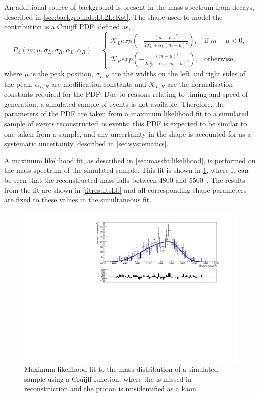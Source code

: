 An additional source of background is present in the \kk mass spectrum from  decays, described in \sect\ref{sec:backgrounds:Lb2LcKst}. The shape used to model the \decay{\Lb}{\Lc\Kstarm} contribution is a Cruijff PDF, defined as,
\begin{equation}
  P_{\Lambda}(m; \mu,\sigma_L,\sigma_R,\alpha_L,\alpha_R)=
\begin{cases}
    \mathcal{K}_{L} exp \left( -\frac{(m-\mu)^2}{2\sigma_L^2 + \alpha_L(m-\mu)^2} \right) ,     & \text{if } m-\mu < 0, \\
    \mathcal{K}_{R} exp \left( -\frac{(m-\mu)^2}{2\sigma_R^2 + \alpha_R(m-\mu)^2} \right) ,     & \text{otherwise,}
\end{cases}
\label{Cruijff}
\end{equation}%
where $\mu$ is the peak position, $\sigma_{L,R}$ are the widths on the left and right sides of the peak, $\alpha_{L,R}$ are modification constants and $\mathcal{K}_{L,R}$ are the normalisation constants required for the PDF. Due to reasons relating to timing and speed of generation, a simulated sample of \decay{\Lb}{\Lc\Kstarm} events is not available. Therefore, the parameters of the PDF are taken from a maximum likelihood fit to a simulated sample of \decay{\Lb}{\Lc\Km} events reconstructed as \decay{\Bm}{\D\Km} events; this PDF is expected to be similar to one taken from a \decay{\Lb}{\Lc\Kstarm} sample, and any uncertainty in the shape is accounted for as a systematic uncertainty, described in \sect\ref{sec:systematics}.

A maximum likelihood fit, as described in \sect\ref{sec:massfit:likelihood}, is performed on the \Bm mass spectrum of the simulated sample. This fit is shown in \fig\ref{Lbfit}, where it can be seen that the reconstructed \Bm mass falls between 4800 and 5500~\mevcc. The results from the fit are shown in \tab\ref{fitresultsLb} and all corresponding shape parameters are fixed to these values in the simultaneous fit.

\begin{figure}[h]
\centering
\includegraphics[width=0.7\linewidth]{figures/backgrounds/Lb2LcKst.pdf}
\caption{Maximum likelihood fit to the mass distribution of a simulated  sample using a Cruijff function, where the \pip is missed in reconstruction and the proton is misidentified as a kaon.}
\label{Lbfit}
\end{figure}

